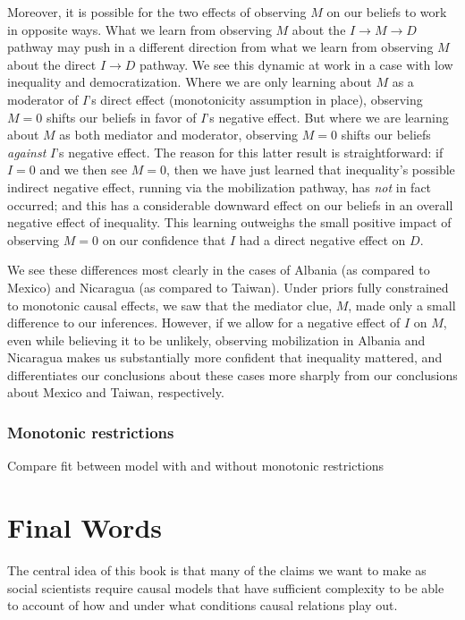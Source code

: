 \documentclass[12pt,]{book}
\begin{document}
Moreover, it is possible for the two effects of observing \(M\) on our beliefs to work in opposite ways. What we learn from observing \(M\) about the \(I \rightarrow M \rightarrow D\) pathway may push in a different direction from what we learn from observing \(M\) about the direct \(I \rightarrow D\) pathway. We see this dynamic at work in a case with low inequality and democratization. Where we are only learning about \(M\) as a moderator of \(I\)'s direct effect (monotonicity assumption in place), observing \(M=0\) shifts our beliefs in favor of \(I\)'s negative effect. But where we are learning about \(M\) as both mediator and moderator, observing \(M=0\) shifts our beliefs \emph{against} \(I\)'s negative effect. The reason for this latter result is straightforward: if \(I=0\) and we then see \(M=0\), then we have just learned that inequality's possible indirect negative effect, running via the mobilization pathway, has \emph{not} in fact occurred; and this has a considerable downward effect on our beliefs in an overall negative effect of inequality. This learning outweighs the small positive impact of observing \(M=0\) on our confidence that \(I\) had a direct negative effect on \(D\).

We see these differences most clearly in the cases of Albania (as compared to Mexico) and Nicaragua (as compared to Taiwan). Under priors fully constrained to monotonic causal effects, we saw that the mediator clue, \(M\), made only a small difference to our inferences. However, if we allow for a negative effect of \(I\) on \(M\), even while believing it to be unlikely, observing mobilization in Albania and Nicaragua makes us substantially more confident that inequality mattered, and differentiates our conclusions about these cases more sharply from our conclusions about Mexico and Taiwan, respectively.

\hypertarget{monotonic-restrictions}{%
\subsection{Monotonic restrictions}\label{monotonic-restrictions}}

Compare fit between model with and without monotonic restrictions

\hypertarget{final-words}{%
\chapter{Final Words}\label{final-words}}

The central idea of this book is that many of the claims we want to make as social scientists require causal models that have sufficient complexity to be able to account of how and under what conditions causal relations play out.
\end{document}
